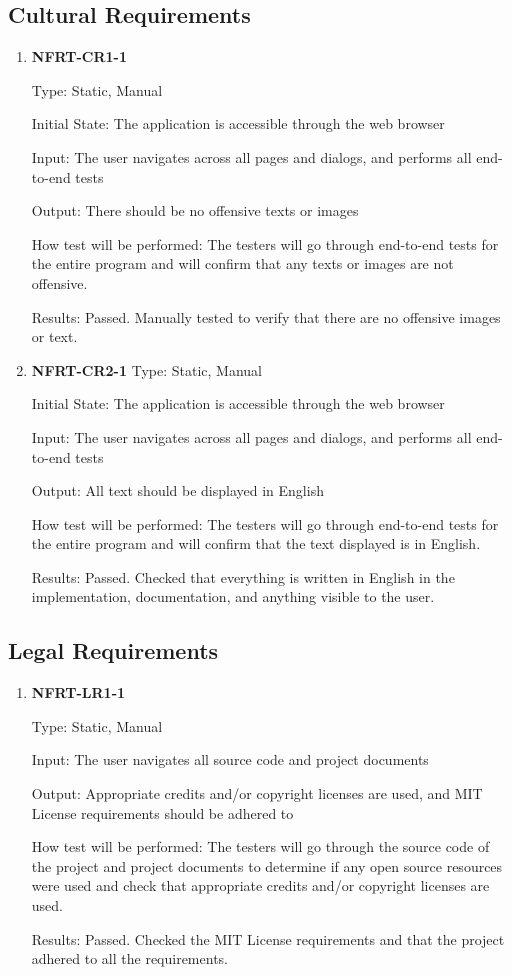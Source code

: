 \documentclass[12pt, titlepage]{article}
\begin{document}
\subsection{Cultural Requirements}
\begin{enumerate}
	\item \textbf{NFRT-CR1-1}

	      Type: Static, Manual

	      Initial State: The application is accessible through the web browser

	      Input: The user navigates across all pages and dialogs, and performs all end-to-end tests

	      Output: There should be no offensive texts or images

	      How test will be performed: The testers will go through end-to-end tests for the entire program and
	      will confirm that any texts or images are not offensive.

	      Results: Passed. Manually tested to verify that there are no offensive images or text.

	\item \textbf{NFRT-CR2-1}
	      Type: Static, Manual

	      Initial State: The application is accessible through the web browser

	      Input: The user navigates across all pages and dialogs, and performs all end-to-end tests

	      Output: All text should be displayed in English

	      How test will be performed: The testers will go through end-to-end tests for the entire program and
	      will confirm that the text displayed is in English.

	      Results: Passed. Checked that everything is written in English in the implementation,
	      documentation, and anything visible to the user.

\end{enumerate}

\subsection{Legal Requirements}
\begin{enumerate}
	\item \textbf{NFRT-LR1-1}

	      Type: Static, Manual

	      Input: The user navigates all source code and project documents

	      Output: Appropriate credits and/or copyright licenses are used, and MIT License requirements should
	      be adhered to

	      How test will be performed: The testers will go through the source code of the project and project
	      documents to determine if any open source resources were used and check that appropriate credits
	      and/or copyright licenses are used.

	      Results: Passed. Checked the MIT License requirements and that the project adhered to all the
	      requirements.

\end{enumerate}
\end{document}
